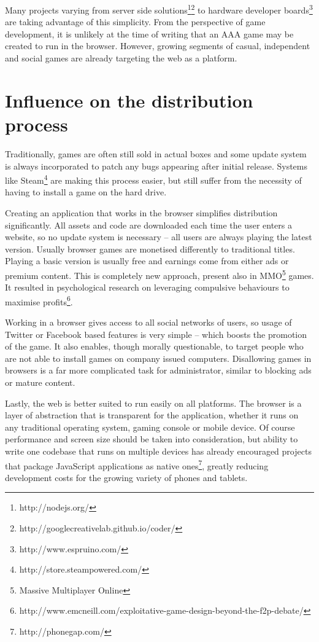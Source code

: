Many projects varying from server side solutions\footnote{http://nodejs.org/}\footnote{http://googlecreativelab.github.io/coder/} to hardware developer boards\footnote{http://www.espruino.com/} are taking advantage of this simplicity. From the perspective of game development, it is unlikely at the time of writing that an AAA game may be created to run in the browser. However, growing segments of casual, independent and social games are already targeting the web as a platform.

\section{Influence on the distribution process}

Traditionally, games are often still sold in actual boxes and some update system is always incorporated to patch any bugs appearing after initial release. Systems like Steam\footnote{http://store.steampowered.com/} are making this process easier, but still suffer from the necessity of having to install a game on the hard drive.

Creating an application that works in the browser simplifies distribution significantly. All assets and code are downloaded each time the user enters a website, so no update system is necessary -- all users are always playing the latest version. Usually browser games are monetised differently to traditional titles. Playing a basic version is usually free and earnings come from either ads or premium content. This is completely new approach, present also in MMO\footnote{Massive Multiplayer Online} games. It resulted in psychological research on leveraging compulsive behaviours to maximise profits\footnote{http://www.emcneill.com/exploitative-game-design-beyond-the-f2p-debate/}.

Working in a browser gives access to all social networks of users, so usage of Twitter or Facebook based features is very simple -- which boosts the promotion of the game. It also enables, though morally questionable, to target people who are not able to install games on company issued computers. Disallowing games in browsers is a far more complicated task for administrator, similar to blocking ads or mature content.

Lastly, the web is better suited to run easily on all platforms. The browser is a layer of abstraction that is transparent for the application, whether it runs on any traditional operating system, gaming console or mobile device. Of course performance and screen size should be taken into consideration, but ability to write one codebase that runs on multiple devices has already encouraged projects that package JavaScript applications as native ones\footnote{http://phonegap.com/}, greatly reducing development costs for the growing variety of phones and tablets.

